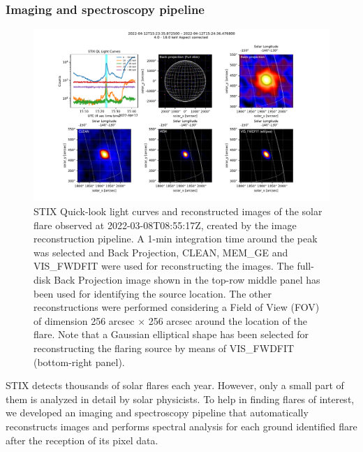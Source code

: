 \documentclass[referee]{preaa} %
\begin{document}
\subsubsection{Imaging and spectroscopy pipeline}
\begin{figure}
  \centering
  \includegraphics[width=0.95\linewidth]{figures/imaging_pipeline.pdf}
  \caption{ 
   STIX Quick-look light curves and reconstructed images of the solar flare observed at 2022-03-08T08:55:17Z, 
   created by the image reconstruction pipeline.  A 1-min integration time around the peak was selected and Back Projection, CLEAN, MEM\_GE and VIS\_FWDFIT were used for reconstructing the images. 
The full-disk Back Projection image shown in the top-row middle panel has been used for identifying the source location. The other reconstructions were performed considering a Field of View (FOV) of dimension 256 arcsec $\times$ 256 arcsec around the location of the flare. Note that a Gaussian elliptical shape has been selected for reconstructing the flaring source by means of VIS\_FWDFIT (bottom-right panel). }
  \label{fig:imaging}
\end{figure}
STIX detects thousands of solar flares each year. However, only a small part of them is analyzed in detail by solar physicists. 
To help in finding flares of interest, we developed an imaging and spectroscopy pipeline that automatically reconstructs images and performs spectral analysis for each ground identified flare after the reception of its pixel data. 
\end{document}
